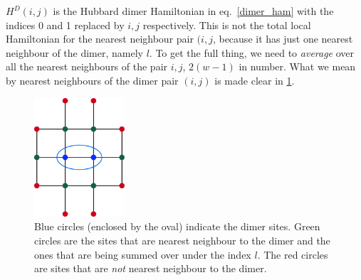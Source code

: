 \documentclass{report}
\numberwithin{equation}{section}
\begin{document}
\(H^D(i, j)\) is the Hubbard dimer Hamiltonian in eq.~\ref{dimer_ham} with the indices 0 and 1 replaced by \(i, j\) respectively. This is not the total local Hamiltonian for the nearest neighbour pair \((i,j\), because it has just one nearest neighbour of the dimer, namely \(l\). To get the full thing, we need to \textit{average} over all the nearest neighbours of the pair \(i,j\), \(2(w-1)\) in number. What we mean by nearest neighbours of the dimer pair \((i,j)\) is made clear in \ref{dimer-nn}.
\begin{figure}[htpb]
	\centering
	\includegraphics[width=0.3\textwidth]{../figures/dimer-nn.pdf}
	\caption{Blue circles (enclosed by the oval) indicate the dimer sites. Green circles are the sites that are nearest neighbour to the dimer and the ones that are being summed over under the index \(l\). The red circles are sites that are \textit{not} nearest neighbour to the dimer.}
	\label{dimer-nn}
\end{figure}
\end{document}
